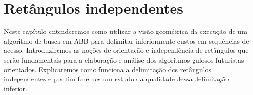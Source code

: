 
\chapter{Retângulos independentes}
\label{cap:retângulos-independentes}

\newcommand{\rectpos}{%
    \begin{tikzpicture}[baseline={(0,0)}, scale=0.2]
        \draw (0,0) rectangle (1.2,1.2); %
        \draw[thick] (0,0) -- (1.2,1.2); %
        \fill (0,0) circle (0.15); %
        \fill (1.2,1.2) circle (0.15); %
    \end{tikzpicture}%
}

\newcommand{\rectneg}{%
    \begin{tikzpicture}[baseline={(0,0)}, scale=0.2]
        \draw (0,0) rectangle (1.2,1.2); %
        \draw[thick] (0,1.2) -- (1.2,0); %
        \fill (0,1.2) circle (0.15); %
        \fill (1.2,0) circle (0.15); %
    \end{tikzpicture}%
}

\newcommand{\recttotal}{%
    \begin{tikzpicture}[baseline={(0,0)}, scale=0.2]
        \draw (0,0) rectangle (1.2,1.2); %
        \draw[thick] (0,1.2) -- (1.2,0); %
        \draw[thick] (0,0) -- (1.2,1.2); %
        \fill (0,1.2) circle (0.15); %
        \fill (1.2,0) circle (0.15); %
        \fill (0,0) circle (0.15); %
        \fill (1.2,1.2) circle (0.15); %
    \end{tikzpicture}%
}

Neste capítulo entenderemos como utilizar a visão geométrica da execução de um algoritmo de busca em ABB para delimitar inferiormente custos em sequências de acesso. Introduziremos as noções de orientação e independência de retângulos que serão fundamentais para a elaboração e análise dos algoritmos gulosos futuristas orientados. Explicaremos como funciona a delimitação dos retângulos independentes e por fim faremos um estudo da qualidade dessa delimitação inferior.

